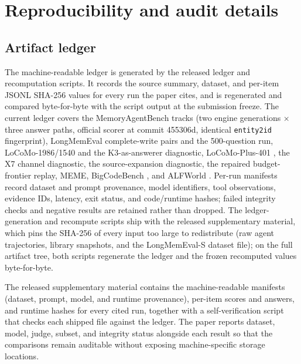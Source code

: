\section{Reproducibility and audit details}

\subsection{Artifact ledger}
\label{app:ledger}

The machine-readable ledger is generated by the released ledger and recomputation scripts. It records the source summary, dataset, and per-item JSONL SHA-256 values for every run the paper cites, and is regenerated and compared byte-for-byte with the script output at the submission freeze. The current ledger covers the MemoryAgentBench tracks (two engine generations $\times$ three answer paths, official scorer at commit 455306d, identical \texttt{entity2id} fingerprint), LongMemEval complete-write pairs and the 500-question run, LoCoMo-1986/1540 and the K3-as-answerer diagnostic, LoCoMo-Plus-401 \citep{li-etal-2026-locomo}, the X7 channel diagnostic, the source-expansion diagnostic, the repaired budget-frontier replay, MEME, BigCodeBench \citep{zhuo2024bigcodebench}, and ALFWorld \citep{shridhar2021alfworld}. Per-run manifests record dataset and prompt provenance, model identifiers, tool observations, evidence IDs, latency, exit status, and code/runtime hashes; failed integrity checks and negative results are retained rather than dropped. The ledger-generation and recompute scripts ship with the released supplementary material, which pins the SHA-256 of every input too large to redistribute (raw agent trajectories, library snapshots, and the LongMemEval-S dataset file); on the full artifact tree, both scripts regenerate the ledger and the frozen recomputed values byte-for-byte.

The released supplementary material contains the machine-readable manifests (dataset, prompt, model, and runtime provenance), per-item scores and answers, and runtime hashes for every cited run, together with a self-verification script that checks each shipped file against the ledger. The paper reports dataset, model, judge, subset, and integrity status alongside each result so that the comparisons remain auditable without exposing machine-specific storage locations.

